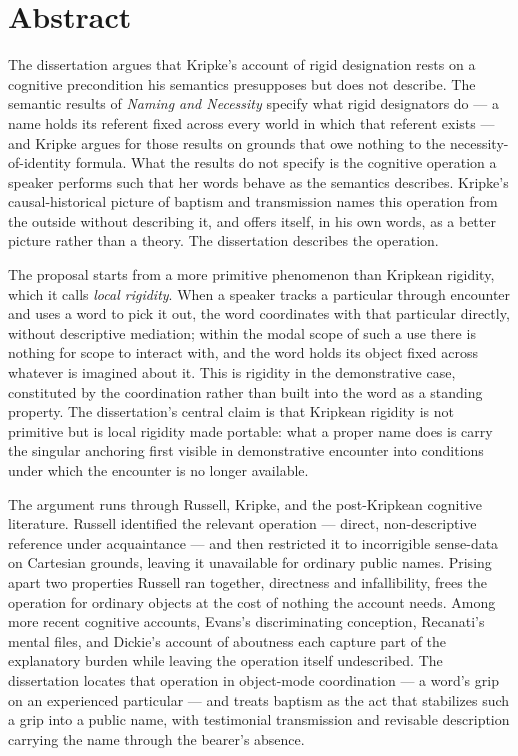 \documentclass[12pt,a4paper]{article}
\begin{document}
\pagestyle{plain}

\section*{Abstract}\label{abstract}

The dissertation argues that Kripke's account of rigid designation rests on a cognitive precondition his semantics presupposes but does not describe. The semantic results of \emph{Naming and Necessity} specify what rigid designators do --- a name holds its referent fixed across every world in which that referent exists --- and Kripke argues for those results on grounds that owe nothing to the necessity-of-identity formula. What the results do not specify is the cognitive operation a speaker performs such that her words behave as the semantics describes. Kripke's causal-historical picture of baptism and transmission names this operation from the outside without describing it, and offers itself, in his own words, as a better picture rather than a theory. The dissertation describes the operation.

The proposal starts from a more primitive phenomenon than Kripkean rigidity, which it calls \emph{local rigidity}. When a speaker tracks a particular through encounter and uses a word to pick it out, the word coordinates with that particular directly, without descriptive mediation; within the modal scope of such a use there is nothing for scope to interact with, and the word holds its object fixed across whatever is imagined about it. This is rigidity in the demonstrative case, constituted by the coordination rather than built into the word as a standing property. The dissertation's central claim is that Kripkean rigidity is not primitive but is local rigidity made portable: what a proper name does is carry the singular anchoring first visible in demonstrative encounter into conditions under which the encounter is no longer available.

The argument runs through Russell, Kripke, and the post-Kripkean cognitive literature. Russell identified the relevant operation --- direct, non-descriptive reference under acquaintance --- and then restricted it to incorrigible sense-data on Cartesian grounds, leaving it unavailable for ordinary public names. Prising apart two properties Russell ran together, directness and infallibility, frees the operation for ordinary objects at the cost of nothing the account needs. Among more recent cognitive accounts, Evans's discriminating conception, Recanati's mental files, and Dickie's account of aboutness each capture part of the explanatory burden while leaving the operation itself undescribed. The dissertation locates that operation in object-mode coordination --- a word's grip on an experienced particular --- and treats baptism as the act that stabilizes such a grip into a public name, with testimonial transmission and revisable description carrying the name through the bearer's absence.
\end{document}
